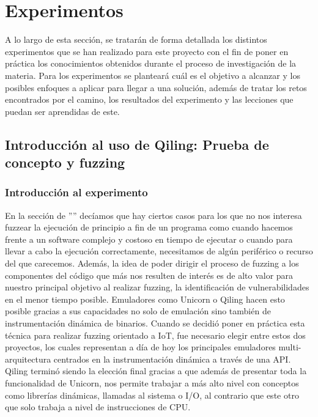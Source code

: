 \chapter{Experimentos}
\label{experimentos}
A lo largo de esta sección, se tratarán de forma detallada los distintos experimentos que se han realizado para este proyecto con el fin de 
poner en práctica los conocimientos obtenidos durante el proceso de investigación de la materia. Para los experimentos se planteará cuál es el 
objetivo a alcanzar y los posibles enfoques a aplicar para llegar a una solución, además de tratar los retos encontrados por el camino, los 
resultados del experimento y las lecciones que puedan ser aprendidas de este.

\section{Introducción al uso de Qiling: Prueba de concepto y fuzzing}
\subsection{Introducción al experimento}
En la sección de '''' decíamos que hay ciertos casos para los que no nos interesa fuzzear la ejecución de principio a fin 
de un programa como cuando hacemos frente a un software complejo y costoso en tiempo de ejecutar o cuando para llevar a cabo la ejecución correctamente, 
necesitamos de algún periférico o recurso del que carecemos. Además, la idea de poder dirigir el proceso de fuzzing a los componentes del código que más nos 
resulten de interés es de alto valor para nuestro principal objetivo al realizar fuzzing, la identificación de vulnerabilidades en el menor tiempo posible.
Emuladores como Unicorn o Qiling hacen esto posible gracias a sus capacidades no solo de emulación sino también de instrumentación dinámica de binarios.
Cuando se decidió poner en práctica esta técnica para realizar fuzzing orientado a IoT, fue necesario elegir entre estos dos proyectos, los cuales 
representan a día de hoy los principales emuladores multi-arquitectura centrados en la instrumentación dinámica a través de una API. Qiling terminó siendo 
la elección final gracias a que además de presentar toda la funcionalidad de Unicorn, nos permite trabajar a más alto nivel con conceptos como librerías dinámicas,
llamadas al sistema o I/O, al contrario que este otro que solo trabaja a nivel de instrucciones de CPU.\bigskip

